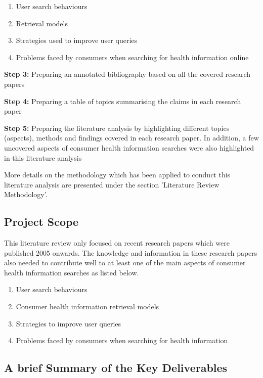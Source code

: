\documentclass[]{article}
\begin{document}
\begin{enumerate}
	\item User search behaviours
	\item Retrieval models
	\item Strategies used to improve user queries
	\item Problems faced by consumers when searching for health information online	
\end{enumerate}	 
	
\textbf{Step 3:} Preparing an annotated bibliography based on all the covered research papers
	
\textbf{Step 4:} Preparing a table of topics summarising the claims in each research paper
	
\textbf{Step 5:} Preparing the literature analysis by highlighting different topics (aspects), methods and findings covered in each research paper. In addition, a few uncovered aspects of consumer health information searches were also highlighted in this literature analysis
	
More details on the methodology which has been applied to conduct this literature analysis are presented under the section 'Literature Review Methodology'. \\ 
	
\subsection{Project Scope}
	
This literature review only focused on recent research papers which were published 2005 onwards. The knowledge and information in these research papers also needed to contribute well to at least one of the main aspects of consumer health information searches as listed below.

\begin{enumerate}
	\item User search behaviours
	\item Consumer health information retrieval models
	\item Strategies to improve user queries
	\item Problems faced by consumers when searching for health information	\\
\end{enumerate}	
	
\subsection{A brief Summary of the Key Deliverables}
	
\end{document}
